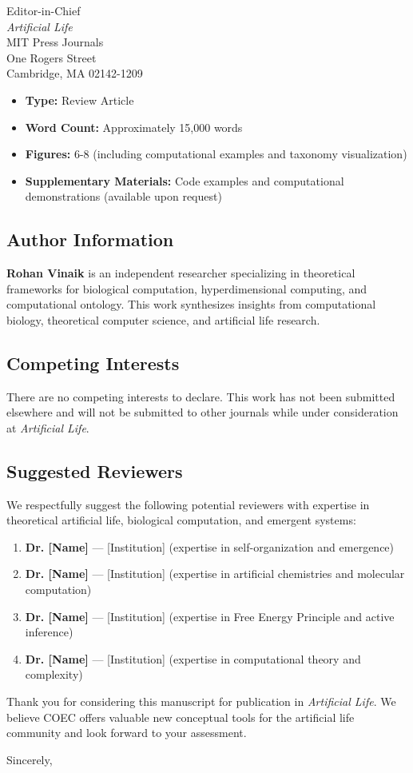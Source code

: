 \documentclass[11pt]{letter}
\begin{document}
\begin{letter}{%
Editor-in-Chief\\
\textit{Artificial Life}\\
MIT Press Journals\\
One Rogers Street\\
Cambridge, MA 02142-1209
}
\begin{itemize}
    \item \textbf{Type:} Review Article
    \item \textbf{Word Count:} Approximately 15,000 words
    \item \textbf{Figures:} 6-8 (including computational examples and taxonomy visualization)
    \item \textbf{Supplementary Materials:} Code examples and computational demonstrations (available upon request)
\end{itemize}

\subsection*{Author Information}

\textbf{Rohan Vinaik} is an independent researcher specializing in theoretical frameworks for biological computation, hyperdimensional computing, and computational ontology. This work synthesizes insights from computational biology, theoretical computer science, and artificial life research.

\subsection*{Competing Interests}

There are no competing interests to declare. This work has not been submitted elsewhere and will not be submitted to other journals while under consideration at \textit{Artificial Life}.

\subsection*{Suggested Reviewers}

We respectfully suggest the following potential reviewers with expertise in theoretical artificial life, biological computation, and emergent systems:

\begin{enumerate}
    \item \textbf{Dr. [Name]} — [Institution] (expertise in self-organization and emergence)
    \item \textbf{Dr. [Name]} — [Institution] (expertise in artificial chemistries and molecular computation)
    \item \textbf{Dr. [Name]} — [Institution] (expertise in Free Energy Principle and active inference)
    \item \textbf{Dr. [Name]} — [Institution] (expertise in computational theory and complexity)
\end{enumerate}

Thank you for considering this manuscript for publication in \textit{Artificial Life}. We believe COEC offers valuable new conceptual tools for the artificial life community and look forward to your assessment.

\closing{Sincerely,}

\end{letter}
\end{document}
